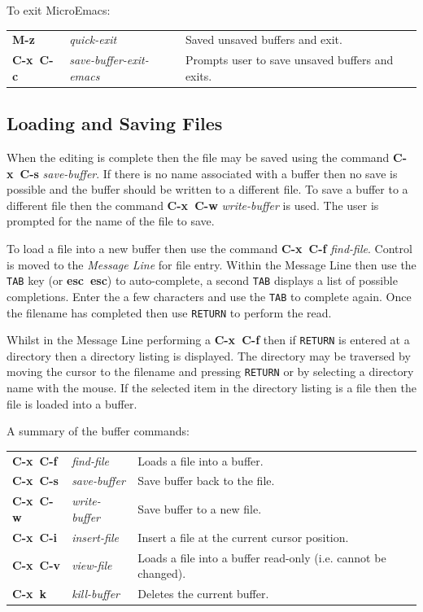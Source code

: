 \documentclass[11pt,a4paper,pdftex]{article}
\begin{document}
  To exit MicroEmacs:

  \begin{longtable}{ll@{\ --\ }l}
    \endhead
    \endfoot
    \endlastfoot
    \textbf{M-z} & \textit{quick-exit} &
    Saved unsaved buffers and exit.\\
    \textbf{C-x~C-c} & \textit{save-buffer-exit-emacs} &
    Prompts user to save unsaved buffers and exits.\\
  \end{longtable}

\subsection{Loading and Saving Files}

  When the editing is complete then the file may be saved using the command
  \textbf{C-x~C-s} \textit{save-buffer}. If there is no name associated with a
  buffer then no save is possible and the buffer should be written to a
  different file. To save a buffer to a different file then the command
  \textbf{C-x~C-w} \textit{write-buffer} is used. The user is prompted for the
  name of the file to save.

  To load a file into a new buffer then use the command \textbf{C-x~C-f}
  \textit{find-file}. Control is moved to the \textit{Message Line} for file
  entry. Within the Message Line then use the \texttt{TAB} key (or
  \textbf{esc~esc}) to auto-complete, a second \texttt{TAB} displays a list of
  possible completions. Enter the a few characters and use the \texttt{TAB} to
  complete again. Once the filename has completed then use \texttt{RETURN} to
  perform the read.

  Whilst in the Message Line performing a \textbf{C-x~C-f} then if
  \texttt{RETURN} is entered at a directory then a directory listing is
  displayed. The directory may be traversed by moving the cursor to the
  filename and pressing \texttt{RETURN} or by selecting a directory name with
  the mouse. If the selected item in the directory listing is a file then the
  file is loaded into a buffer.

  A summary of the buffer commands:

  \begin{longtable}{ll@{\ --\ }l}
    \endhead
    \endfoot
    \endlastfoot
    \textbf{C-x~C-f} & \textit{find-file} &
    Loads a file into a buffer.\\
    \textbf{C-x~C-s} & \textit{save-buffer} &
    Save buffer back to the file.\\
    \textbf{C-x~C-w} & \textit{write-buffer} &
    Save buffer to a new file.\\
    \textbf{C-x~C-i} & \textit{insert-file} &
    Insert a file at the current cursor position.\\
    \textbf{C-x~C-v} & \textit{view-file} &
    Loads a file into a buffer read-only (i.e. cannot be changed).\\
    \textbf{C-x~k} & \textit{kill-buffer} &
    Deletes the current buffer.\\
  \end{longtable}
\end{document}
